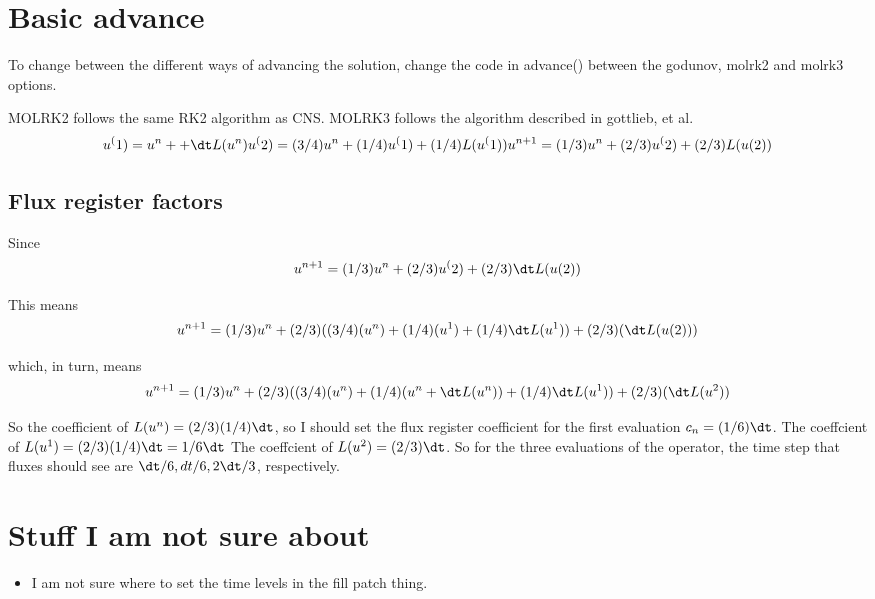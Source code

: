 \section{Basic advance}
To change between the different ways of advancing the solution, change
the code in advance() between the godunov, molrk2 and molrk3 options.

MOLRK2 follows the same RK2 algorithm as CNS.
MOLRK3 follows the algorithm described in gottlieb, et al.
$$
u^(1) = u^n +  + \dt L(u^n)  \\
u^(2) = (3/4) u^n + (1/4) u^(1)  + (1/4) L(u^(1))
u^{n+1} = (1/3) u^n + (2/3) u^(2)  + (2/3) L(u(2))
$$

\subsection{Flux register factors}

Since 
$$
u^{n+1} = (1/3) u^n + (2/3) u^(2)  + (2/3) \dt L(u(2))
$$

This means 
$$
u^{n+1} = (1/3) u^n + (2/3)((3/4)(u^n) + (1/4)(u^1) + (1/4)\dt L(u^1))  + (2/3)( \dt L(u(2)))
$$

which, in turn, means
$$
u^{n+1} = (1/3) u^n + (2/3)((3/4)(u^n) + (1/4)(u^n + \dt L(u^n)) + (1/4)\dt L(u^1))  + (2/3)( \dt L(u^2))
$$

So the coefficient of $L(u^n) = (2/3)(1/4)\dt$, so I should set the
flux register coefficient for the first evaluation $c_n = (1/6)\dt$.
The coeffcient of $L(u^1) = (2/3)(1/4)\dt = 1/6 \dt$
The coeffcient of $L(u^2) = (2/3) \dt$.   So for the three evaluations
of the operator, the time step  that fluxes should see are $\dt/6,
dt/6, 2\dt/3$, respectively.


\section{Stuff I am not sure about}

\begin{itemize}
  \item I am not sure where to set the time levels  in the fill patch thing.
\end{itemize}
